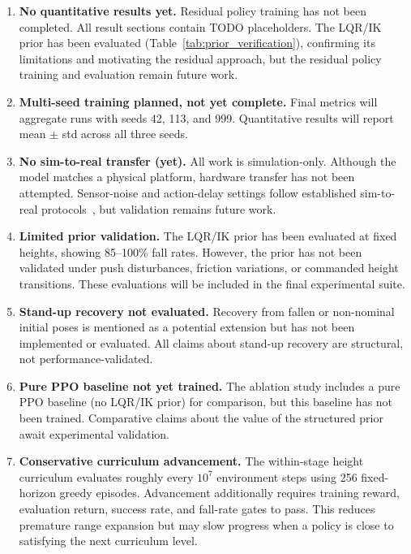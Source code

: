\documentclass[conference]{IEEEtran}
\begin{document}
\begin{enumerate}
    \item \textbf{No quantitative results yet.}
    Residual policy training has not been completed.
    All result sections contain TODO placeholders.
    The LQR/IK prior has been evaluated (Table~\ref{tab:prior_verification}),
    confirming its limitations and motivating the residual approach,
    but the residual policy training and evaluation remain future work.

    \item \textbf{Multi-seed training planned, not yet complete.}
    Final metrics will aggregate runs with seeds 42, 113, and 999.
    Quantitative results will report mean $\pm$ std across all three seeds.

    \item \textbf{No sim-to-real transfer (yet).}
    All work is simulation-only.
    Although the model matches a physical platform, hardware transfer
    has not been attempted.
    Sensor-noise and action-delay settings follow established
    sim-to-real protocols~\cite{tobin2017domain,peng2018simtoreal,tan2018simtoreal},
    but validation remains future work.

    \item \textbf{Limited prior validation.}
    The LQR/IK prior has been evaluated at fixed heights, showing
    85--100\% fall rates. However, the prior has not been validated
    under push disturbances, friction variations, or commanded height
    transitions. These evaluations will be included in the final
    experimental suite.

    \item \textbf{Stand-up recovery not evaluated.}
    Recovery from fallen or non-nominal initial poses is mentioned
    as a potential extension but has not been implemented or evaluated.
    All claims about stand-up recovery are structural, not
    performance-validated.

    \item \textbf{Pure PPO baseline not yet trained.}
    The ablation study includes a pure PPO baseline (no LQR/IK prior)
    for comparison, but this baseline has not been trained.
    Comparative claims about the value of the structured prior
    await experimental validation.

    \item \textbf{Conservative curriculum advancement.}
    The within-stage height curriculum evaluates roughly every
    $10^7$ environment steps using 256 fixed-horizon greedy episodes.
    Advancement additionally requires training reward, evaluation return,
    success rate, and fall-rate gates to pass.
    This reduces premature range expansion but may slow progress when a
    policy is close to satisfying the next curriculum level.
\end{enumerate}
\end{document}
